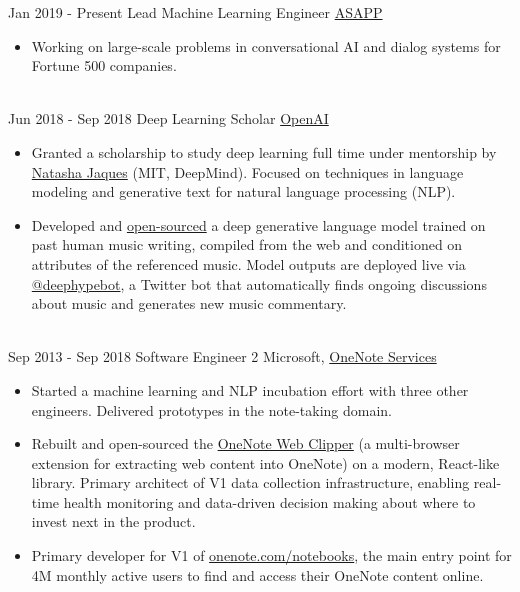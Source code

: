 \documentclass[letterpaper]{twentysecondcv} %
\begin{document}
\begin{twenty} %
    \twentyitem
    	{Jan 2019 -}
		{Present}
        {Lead Machine Learning Engineer}
        {\href{https://www.asapp.com/}{ASAPP}}
        {}
        {
        {\begin{itemize} \itemsep -2pt %
        \item Working on large-scale problems in conversational AI and dialog systems for Fortune 500 companies.
        \end{itemize}}
        }
    \\
    \twentyitem
    	{Jun 2018 -}
		{Sep 2018}
        {Deep Learning Scholar}
        {\href{https://blog.openai.com/openai-scholars/}{OpenAI}}
        {}
        {
        {\begin{itemize} \itemsep -2pt %
        \item Granted a scholarship to study deep learning full time under mentorship by \href{https://www.linkedin.com/in/natashajaques}{Natasha Jaques} (MIT, DeepMind). Focused on techniques in language modeling and generative text for natural language processing (NLP).
        \item Developed and \href{https://github.com/iconix/deephypebot}{open-sourced} a deep generative language model trained on past human music writing, compiled from the web and conditioned on attributes of the referenced music. Model outputs are deployed live via \href{https://twitter.com/deephypebot}{@deephypebot}, a Twitter bot that automatically finds ongoing discussions about music and generates new music commentary.
        \end{itemize}}
        }
    \\
    \twentyitem
    	{Sep 2013 -}
		{Sep 2018}
        {Software Engineer 2}
        {Microsoft, \href{http://www.onenote.com/}{OneNote Services}}
        {}
        {
        {\begin{itemize} \itemsep -2pt %
        \item Started a machine learning and NLP incubation effort with three other engineers. Delivered prototypes in the note-taking domain.
        \item Rebuilt and open-sourced the \href{https://github.com/OneNoteDev/WebClipper}{OneNote Web Clipper} (a multi-browser extension for extracting web content into OneNote) on a modern, React-like library. Primary architect of V1 data collection infrastructure, enabling real-time health monitoring and data-driven decision making about where to invest next in the product.
        \item Primary developer for V1 of \href{https://www.onenote.com/notebooks}{onenote.com/notebooks}, the main entry point for 4M monthly active users to find and access their OneNote content online.
        \end{itemize}}
        }

\end{twenty}
\end{document}
